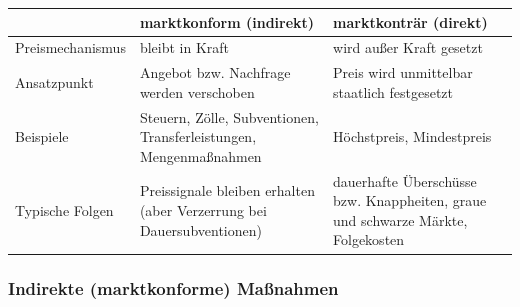 \documentclass[11pt, a4paper]{article}
\begin{document}
\begin{center}
\begin{tabular}{p{3.2cm} p{5.2cm} p{5.2cm}}
\toprule
\rowcolor{bfwTabHead} & \textbf{marktkonform (indirekt)} & \textbf{marktkonträr (direkt)}\\
\midrule
Preismechanismus & bleibt in Kraft & wird außer Kraft gesetzt\\
Ansatzpunkt & Angebot bzw. Nachfrage werden verschoben & Preis wird unmittelbar staatlich festgesetzt\\
Beispiele & Steuern, Zölle, Subventionen, Transferleistungen, Mengenmaßnahmen & Höchstpreis, Mindestpreis\\
Typische Folgen & Preissignale bleiben erhalten (aber Verzerrung bei Dauersubventionen) & dauerhafte Überschüsse bzw. Knappheiten, graue und schwarze Märkte, Folgekosten\\
\bottomrule
\end{tabular}
\end{center}

\subsubsection{Indirekte (marktkonforme) Maßnahmen}
\end{document}
